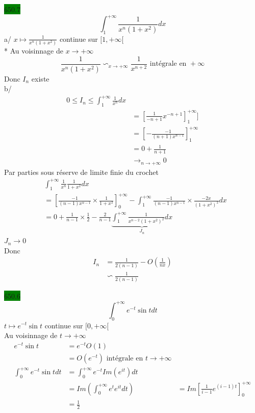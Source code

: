 \documentclass{article}
\begin{document}
\noindent \colorbox{green}{650.7}\\
\begin{equation*}
    \int_{1}^{+\infty}\frac{1}{x^{n}(1+x^{2})}dx
\end{equation*}
a/ \(x \mapsto \frac{1}{x^{n}(1+x^{2})}\) continue sur \([1, +\infty[\)\\
* Au voisinnage de \(x \rightarrow +\infty\)
\begin{equation*}
  \frac{1}{x^{n}(1+x^{2})} \backsim_{x \rightarrow +\infty} \frac{1}{x^{n+2}} \text{ intégrale en } +\infty
\end{equation*}
Donc \(I_{n}\) existe\\
b/ 
\begin{align*}
    0 \leq I_{n} \leq \int_{1}^{+\infty}\frac{1}{x^{n}}dx\\
    &= [\frac{1}{-n+1}x^{-n+1}]^{+\infty}_{1}]\\
    &= [-\frac{-1}{(n+1)x^{n-1}}]^{+\infty}_{1}\\
    &= 0 + \frac{1}{n+1}\\
    &\rightarrow_{n \rightarrow +\infty} 0
\end{align*}
Par parties sous réserve de limite finie du crochet 
\begin{align*}
    &\int_{1}^{+\infty}\frac{1}{x^{n}}\frac{1}{1+x^{2}}dx\\
    &= [\frac{-1}{(n-1)x^{n-1}}\times \frac{1}{1+x^{2}}]^{+\infty}_{0} - \int_{1}^{+\infty}\frac{-1}{(n-1)x^{n-1}}\times \frac{-2x}{(1+x^{2})^{2}}dx\\
    &= 0 + \frac{1}{n-1}\times \frac{1}{2} - \frac{2}{n-1}\underbrace{\int_{1}^{+\infty}\frac{1}{x^{n-2}(1+x^{2})^{2}}dx}_{J_{n}}
\end{align*}
\(J_{n}\rightarrow 0\)\\
Donc 
\begin{align*}
  I_{n} &= \frac{1}{2(n-1)} - O(\frac{1}{nx})\\
        &\backsim \frac{1}{2(n-1)}
\end{align*}
    
\noindent \colorbox{green}{650.6}
\begin{equation*}
    \int_{0}^{+\infty}e^{-t}\sin t dt 
\end{equation*}
\(t \mapsto e^{-t}\sin t \) continue sur \([0,+\infty[\)\\
Au voisinnage de \(t \rightarrow +\infty\)
\begin{align*}
  e^{-t} \sin t &= e^{-t}O(1)\\
                &= O(e^{-t}) \text{ intégrale en } t \rightarrow +\infty\\
  \int_{0}^{+\infty} e^{-t}\sin t dt &= \int_{0}^{+\infty} e^{-t} Im(e^{it})dt \\
                                     &= Im(\int_{0}^{+\infty}e^{t}e^{it}dt)
                                     &= Im[\frac{1}{i-1}e^{(i-1)t}]^{+\infty}_{0}\\
                                     &= \frac{1}{2}
\end{align*}
\end{document}
